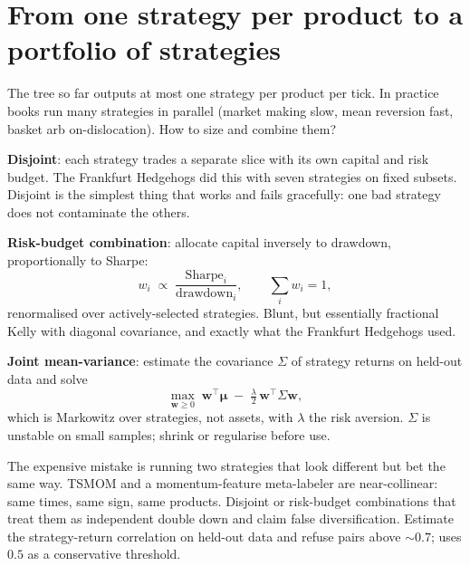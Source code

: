 \section{From one strategy per product to a portfolio of strategies}
\label{sec:wsw_portfolio}

The tree so far outputs at most one strategy per product per tick.
In practice books run many strategies in parallel (market making
slow, mean reversion fast, basket arb on-dislocation). How to size
and combine them?

\textbf{Disjoint}: each strategy trades a separate slice with its
own capital and risk budget. The Frankfurt Hedgehogs did this with
seven strategies on fixed subsets. Disjoint is the simplest thing
that works and fails gracefully: one bad strategy does not
contaminate the others.

\textbf{Risk-budget combination}: allocate capital inversely to
drawdown, proportionally to Sharpe:
\begin{equation}
  w_i \;\propto\; \frac{\text{Sharpe}_i}{\text{drawdown}_i},
  \qquad \sum_i w_i = 1,
  \label{eq:wsw_risk_budget}
\end{equation}
renormalised over actively-selected strategies. Blunt, but
essentially fractional Kelly with diagonal covariance, and exactly
what the Frankfurt Hedgehogs used.

\textbf{Joint mean-variance}: estimate the covariance $\Sigma$ of
strategy returns on held-out data and solve
\begin{equation}
  \max_{\mathbf{w}\ge 0}\;
  \mathbf{w}^{\top}\boldsymbol{\mu}
  \;-\;\tfrac{\lambda}{2}\,
  \mathbf{w}^{\top}\Sigma\mathbf{w},
  \label{eq:wsw_mv_combine}
\end{equation}
which is Markowitz over strategies, not assets, with $\lambda$ the risk
aversion. $\Sigma$ is unstable on small samples; shrink or
regularise before use.

\begin{pitfallbox}
The expensive mistake is running two strategies that look different
but bet the same way. TSMOM and a momentum-feature meta-labeler are
near-collinear: same times, same sign, same products. Disjoint or
risk-budget combinations that treat them as independent double down
and claim false diversification. Estimate the strategy-return
correlation on held-out data and refuse pairs above $\sim 0.7$;
\citeChanQT{} uses $0.5$ as a conservative threshold.
\end{pitfallbox}

